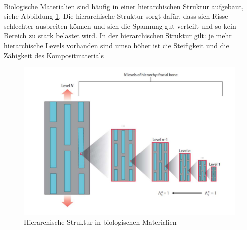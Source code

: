 \documentclass[11pt,a4paper]{article}
\numberwithin{equation}{section}
\numberwithin{figure}{section}
\begin{document}
\\
\begin{addmargin}[25pt]{0pt}
Biologische Materialien sind häufig in einer hierarchischen Struktur aufgebaut, siehe Abbildung \ref{fig:hierarchie}. Die hierarchische Struktur sorgt dafür, dass sich Risse schlechter ausbreiten können und sich die Spannung gut verteilt und so kein Bereich zu stark belastet wird. In der hierarchischen Struktur gilt: je mehr hierarchische Levels vorhanden sind umso höher ist die Steifigkeit und die Zähigkeit des Kompositmaterials \\
\begin{figure}[h]
    \centering
    \includegraphics[scale = 0.85]{images/Materialwissenschaften/hierarchische_struktur.png}
    \caption{Hierarchische Struktur in biologischen Materialien}
    \label{fig:hierarchie}
\end{figure}
\end{addmargin}
\end{document}
